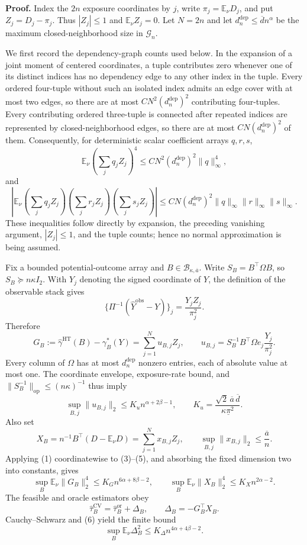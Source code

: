 \textbf{Proof.}
Index the \(2n\) exposure coordinates by \(j\), write \(\pi_j=\mathbb E_\nu D_j\), and put \(Z_j=D_j-\pi_j\).  Thus \(|Z_j|\leq1\) and \(\mathbb E_\nu Z_j=0\).  Let \(N=2n\) and let \(d_n^{\mathrm{dep}}\leq\overline d n^\alpha\) be the maximum closed-neighborhood size in \(\mathcal G_n\).

We first record the dependency-graph counts used below.  In the expansion of a joint moment of centered coordinates, a tuple contributes zero whenever one of its distinct indices has no dependency edge to any other index in the tuple.  Every ordered four-tuple without such an isolated index admits an edge cover with at most two edges, so there are at most \(C N^2(d_n^{\mathrm{dep}})^2\) contributing four-tuples.  Every contributing ordered three-tuple is connected after repeated indices are represented by closed-neighborhood edges, so there are at most \(C N(d_n^{\mathrm{dep}})^2\) of them.  Consequently, for deterministic scalar coefficient arrays \(q,r,s\),
\[
 \mathbb E_\nu\!\left(\sum_jq_jZ_j\right)^4
 \leq C N^2(d_n^{\mathrm{dep}})^2\lVert q\rVert_\infty^4,
 \tag{1}
\]
and
\[
 \left|\mathbb E_\nu
 \left(\sum_jq_jZ_j\right)
 \left(\sum_jr_jZ_j\right)
 \left(\sum_js_jZ_j\right)\right|
 \leq C N(d_n^{\mathrm{dep}})^2
 \lVert q\rVert_\infty\lVert r\rVert_\infty\lVert s\rVert_\infty.
 \tag{2}
\]
These inequalities follow directly by expansion, the preceding vanishing argument, \(|Z_j|\leq1\), and the tuple counts; hence no normal approximation is being assumed.

Fix a bounded potential-outcome array and \(B\in\mathcal B_{\kappa,\overline a}\).  Write \(S_B=B^\top\Omega B\), so \(S_B\succeq n\kappa I_2\).  With \(Y_j\) denoting the signed coordinate of \(Y\), the definition of the observable stack gives
\[
 \{\Pi^{-1}(\widehat Y^{\mathrm{obs}}-Y)\}_j
 =\frac{Y_jZ_j}{\pi_j^2}.
\]
Therefore
\[
 G_B:=\widehat\gamma^{\mathrm{HT}}(B)-\gamma_B^*(Y)
 =\sum_{j=1}^{N}u_{B,j}Z_j,
 \qquad
 u_{B,j}=S_B^{-1}B^\top\Omega e_j\frac{Y_j}{\pi_j^2}.
 \tag{3}
\]
Every column of \(\Omega\) has at most \(d_n^{\mathrm{dep}}\) nonzero entries, each of absolute value at most one.  The coordinate envelope, exposure-rate bound, and \(\lVert S_B^{-1}\rVert_{\mathrm{op}}\leq(n\kappa)^{-1}\) thus imply
\[
 \sup_{B,j}\lVert u_{B,j}\rVert_2
 \leq K_u n^{\alpha+2\beta-1},
 \qquad
 K_u=\frac{\sqrt2\,\overline a\,\overline d}{\kappa\underline\pi^2}.
 \tag{4}
\]
Also set
\[
 X_B=n^{-1}B^\top(D-\mathbb E_\nu D)
 =\sum_{j=1}^{N}x_{B,j}Z_j,
 \qquad
 \sup_{B,j}\lVert x_{B,j}\rVert_2\leq\frac{\overline a}{n}.
 \tag{5}
\]
Applying (1) coordinatewise to (3)--(5), and absorbing the fixed dimension two into constants, gives
\[
 \sup_B\mathbb E_\nu\lVert G_B\rVert_2^4
 \leq K_G n^{6\alpha+8\beta-2},
 \qquad
 \sup_B\mathbb E_\nu\lVert X_B\rVert_2^4
 \leq K_X n^{2\alpha-2}.
 \tag{6}
\]
The feasible and oracle estimators obey
\[
 \widehat\tau_B^{\mathrm{CV}}
 =\widehat\tau_B^{\mathrm{or}}+\Delta_B,
 \qquad
 \Delta_B=-G_B^\top X_B.
 \tag{7}
\]
Cauchy--Schwarz and (6) yield the finite bound
\[
 \sup_B\mathbb E_\nu\Delta_B^2
 \leq K_\Delta n^{4\alpha+4\beta-2}.
 \tag{8}
\]

